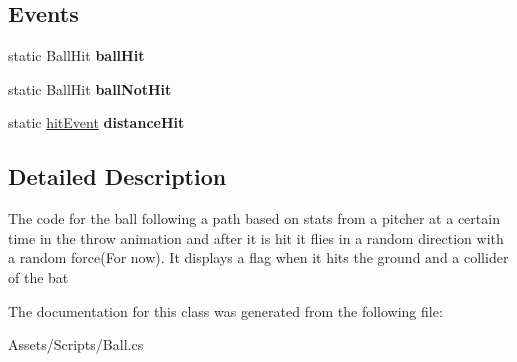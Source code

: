 \subsection*{Events}
\begin{DoxyCompactItemize}
\item 
static Ball\+Hit {\bfseries ball\+Hit}\hypertarget{class_ball_a58700e28710627524386272459258a2d}{}\label{class_ball_a58700e28710627524386272459258a2d}

\item 
static Ball\+Hit {\bfseries ball\+Not\+Hit}\hypertarget{class_ball_a7761d1549a457fcbba713ea70d17afb8}{}\label{class_ball_a7761d1549a457fcbba713ea70d17afb8}

\item 
static \hyperlink{class_ball_a2d0d84bc63e64e13c31052231415af96}{hit\+Event} {\bfseries distance\+Hit}\hypertarget{class_ball_a8219f157afb6f4e3e4ee8650e8298981}{}\label{class_ball_a8219f157afb6f4e3e4ee8650e8298981}

\end{DoxyCompactItemize}


\subsection{Detailed Description}
The code for the ball following a path based on stats from a pitcher at a certain time in the throw animation and after it is hit it flies in a random direction with a random force(\+For now). It displays a flag when it hits the ground and a collider of the bat 

The documentation for this class was generated from the following file\+:\begin{DoxyCompactItemize}
\item 
Assets/\+Scripts/Ball.\+cs\end{DoxyCompactItemize}
